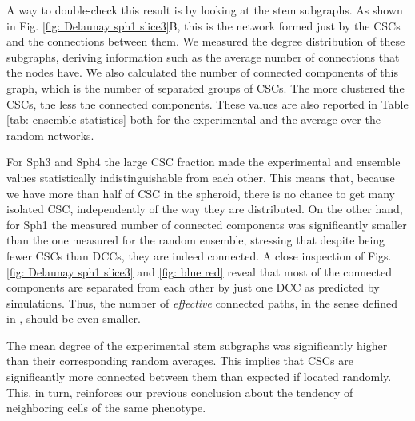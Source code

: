 \documentclass[fleqn,10pt]{wlscirep}
\begin{document}
A way to double-check this result is by looking at the stem subgraphs. As shown in Fig. \ref{fig: Delaunay sph1 slice3}B, this is the network formed just by the CSCs and the connections between them. We measured the degree distribution of these subgraphs, deriving information such as the average number of connections that the nodes have. We also calculated the number of connected components of this graph, which is the number of separated groups of CSCs. The more clustered the CSCs, the less the connected components. These values are also reported in Table \ref{tab: ensemble statistics} both for the experimental and the average over the random networks.

For \textsf{ Sph3} and \textsf{ Sph4} the large CSC fraction made the experimental and ensemble values statistically indistinguishable from each other. This means that, because we have more than half of CSC in the spheroid, there is no chance to get many isolated CSC, independently of the way they are distributed. 
On the other hand, for \textsf{ Sph1} the measured number of connected components was significantly smaller than the one measured for the random ensemble, stressing that despite being fewer CSCs than DCCs, they are indeed connected. A close inspection of Figs. \ref{fig: Delaunay sph1 slice3} and \ref{fig: blue red} reveal that most of the connected components are separated from each other by just one DCC as predicted by simulations. Thus, the number of \emph{effective} connected paths, in the sense defined in \cite{barberis2021percolation}, should be even smaller.

The mean degree of the experimental stem subgraphs was significantly higher than their corresponding random averages. This implies that CSCs are significantly more connected between them than expected if located randomly. This, in turn, reinforces our previous conclusion about the tendency of neighboring cells of the same phenotype. 
% 
\end{document}
